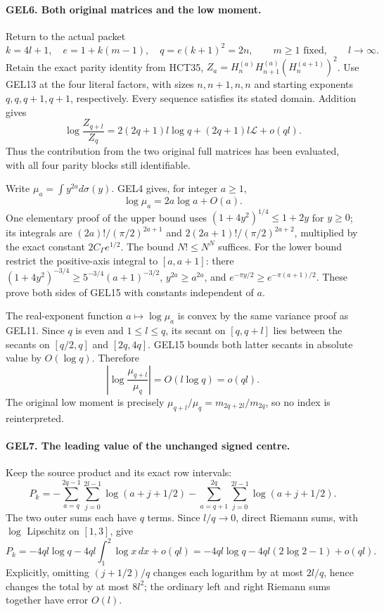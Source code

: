 \documentclass[11pt,a4paper]{article}
\begin{document}
\paragraph{GEL6. Both original matrices and the low moment.}
Return to the actual packet
\[
 k=4l+1,\quad e=1+k(m-1),\quad q=e(k+1)^2=2n,
 \qquad m\geq1\text{ fixed},\qquad l\to\infty.
\]
Retain the exact parity identity from HCT35,
\(Z_a=H_n^{(a)}H_{n+1}^{(a)}(H_n^{(a+1)})^2\).
Use GEL13 at the four literal factors, with sizes \(n,n+1,n,n\)
and starting exponents \(q,q,q+1,q+1\), respectively. Every sequence
satisfies its stated domain. Addition gives
\[
 \boxed{\log\frac{Z_{q+l}}{Z_q}
   =2(2q+1)l\log q+(2q+1)l\mathcal L+o(ql).}
 \tag{GEL14}
\]
Thus the contribution from the two original full matrices has been
evaluated, with all four parity blocks still identifiable.

Write \(\mu_a=\int y^{2a}d\sigma(y)\). GEL4 gives, for integer \(a\geq1\),
\[
 \log\mu_a=2a\log a+O(a).
 \tag{GEL15}
\]
One elementary proof of the upper bound uses
\((1+4y^2)^{1/4}\leq1+2y\) for \(y\geq0\); its integrals are
\((2a)!/(\pi/2)^{2a+1}\) and
\(2(2a+1)!/(\pi/2)^{2a+2}\), multiplied by the exact constant
\(2C_\Gamma e^{1/2}\). The bound \(N!\leq N^N\) suffices.
For the lower bound restrict the positive-axis integral to \([a,a+1]\):
there \((1+4y^2)^{-3/4}\geq5^{-3/4}(a+1)^{-3/2}\),
\(y^{2a}\geq a^{2a}\), and
\(e^{-\pi y/2}\geq e^{-\pi(a+1)/2}\). These prove both sides of GEL15
with constants independent of \(a\).

The real-exponent function \(a\mapsto\log\mu_a\) is convex by the
same variance proof as GEL11. Since \(q\) is even and \(1\leq l\leq q\),
its secant on \([q,q+l]\) lies between the secants on \([q/2,q]\)
and \([2q,4q]\). GEL15 bounds both latter secants in absolute value
by \(O(\log q)\). Therefore
\[
 \left|\log\frac{\mu_{q+l}}{\mu_q}\right|=O(l\log q)=o(ql).
 \tag{GEL16}
\]
The original low moment is precisely
\(\mu_{q+l}/\mu_q=m_{2q+2l}/m_{2q}\), so no index is reinterpreted.

\paragraph{GEL7. The leading value of the unchanged signed centre.}
Keep the source product and its exact row intervals:
\[
 P_k=-\sum_{a=q}^{2q-1}\sum_{j=0}^{2l-1}\log(a+j+1/2)
     -\sum_{a=q+1}^{2q}\sum_{j=0}^{2l-1}\log(a+j+1/2).
\]
The two outer sums each have \(q\) terms. Since \(l/q\to0\), direct
Riemann sums, with \(\log\) Lipschitz on \([1,3]\), give
\[
 P_k=-4ql\log q-4ql\int_1^2\log x\,dx+o(ql)
     =-4ql\log q-4ql(2\log2-1)+o(ql).
 \tag{GEL17}
\]
Explicitly, omitting \((j+1/2)/q\) changes each logarithm by at most
\(2l/q\), hence changes the total by at most \(8l^2\); the ordinary
left and right Riemann sums together have error \(O(l)\).
\end{document}
